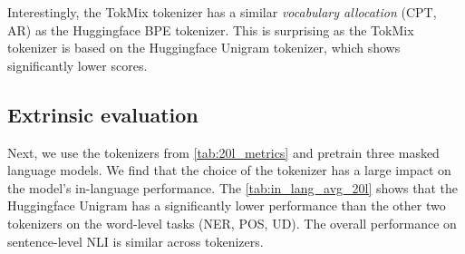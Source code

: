 Interestingly, the TokMix tokenizer has a similar \textit{vocabulary allocation} (CPT, AR) as the Huggingface BPE tokenizer. This is surprising as the TokMix tokenizer is based on the Huggingface Unigram tokenizer, which shows significantly lower scores.

\subsection{Extrinsic evaluation}

Next, we use the tokenizers from \autoref{tab:20l_metrics} and pretrain three masked language models. We find that the choice of the tokenizer has a large impact on the model's in-language performance. The \autoref{tab:in_lang_avg_20l} shows that the Huggingface Unigram has a significantly lower performance than the other two tokenizers on the word-level tasks (NER, POS, UD). The overall performance on sentence-level NLI is similar across tokenizers. %

